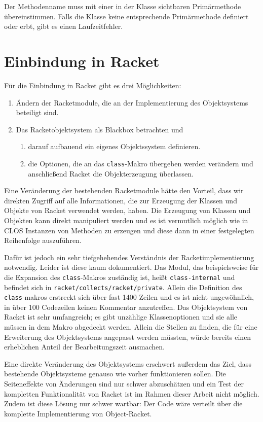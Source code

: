 Der Methodenname muss mit einer in der Klasse sichtbaren Primärmethode übereinstimmen. Falls die Klasse keine entsprechende Primärmethode definiert oder erbt, gibt es einen Laufzeitfehler.

\section{Einbindung in Racket}
Für die Einbindung in Racket gibt es drei Möglichkeiten:
\begin{enumerate}
 \item Ändern der Racketmodule, die an der Implementierung des Objektsystems beteiligt sind.
 \item Das Racketobjektsystem als Blackbox betrachten und 
 \begin{enumerate}
  \item darauf aufbauend ein eigenes Objektssystem definieren.
  \item die Optionen, die an das \texttt{class}-Makro übergeben werden verändern und anschließend Racket die Objekterzeugung überlassen.
 \end{enumerate}
\end{enumerate}

Eine Veränderung der bestehenden Racketmodule hätte den Vorteil, dass wir direkten Zugriff auf alle Informationen, die zur Erzeugung der Klassen und Objekte von Racket verwendet werden, haben. Die Erzeugung von Klassen und Objekten kann direkt manipuliert werden und es ist vermutlich möglich wie in CLOS Instanzen von Methoden zu erzeugen und diese dann in einer festgelegten Reihenfolge auszuführen. 

Dafür ist jedoch ein sehr tiefgehehendes Verständnis der Racketimplementierung notwendig. Leider ist diese kaum dokumentiert. Das Modul, das beispielsweise für die Expansion des \texttt{class}-Makros zuständig ist, heißt \texttt{class-internal} und befindet sich in \texttt{racket/collects/racket/private}. Allein die Definition des \texttt{class}-makros erstreckt sich über fast 1400 Zeilen und es ist nicht ungewöhnlich, in über 100 Codezeilen keinen Kommentar anzutreffen. Das Objektsystem von Racket ist sehr umfangreich; es gibt unzählige Klassenoptionen und sie alle müssen in dem Makro abgedeckt werden. Allein die Stellen zu finden, die für eine Erweiterung des Objektsystems angepasst werden müssten, würde bereits einen erheblichen Anteil der Bearbeitungszeit ausmachen.

Eine direkte Veränderung des Objektsystems erschwert außerdem das Ziel, dass bestehende Objektsysteme genauso wie vorher funktionieren sollen. Die Seiteneffekte von Änderungen sind nur schwer abzuschätzen und ein Test der kompletten Funktionalität von Racket ist im Rahmen dieser Arbeit nicht möglich. Zudem ist diese Lösung nur schwer wartbar: Der Code wäre verteilt über die komplette Implementierung von Object-Racket. 

